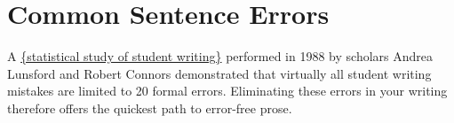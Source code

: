 


\chapter{Common Sentence Errors}

A \href{http://www.jstor.org/discover/10.2307/357695?uid=3739800&uid=2129&uid=2&uid=70&uid=4&uid=3739256&sid=21102412978541}{\{statistical study of student writing\}} performed in 1988 by scholars Andrea
Lunsford and Robert Connors demonstrated that virtually all student
writing mistakes are limited to 20 formal errors. Eliminating these 
errors in your writing therefore offers the quickest path to error-free prose.

